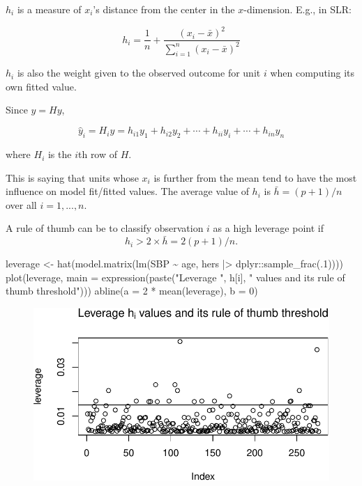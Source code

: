 \documentclass[
  letterpaper,
  DIV=11,
  numbers=noendperiod]{scrreport}
\newenvironment{Shaded}{\begin{snugshade}}{\end{snugshade}}
\newcommand{\AttributeTok}[1]{\textcolor[rgb]{0.40,0.45,0.13}{#1}}
\newcommand{\DecValTok}[1]{\textcolor[rgb]{0.68,0.00,0.00}{#1}}
\newcommand{\FunctionTok}[1]{\textcolor[rgb]{0.28,0.35,0.67}{#1}}
\newcommand{\NormalTok}[1]{\textcolor[rgb]{0.00,0.23,0.31}{#1}}
\newcommand{\OtherTok}[1]{\textcolor[rgb]{0.00,0.23,0.31}{#1}}
\newcommand{\SpecialCharTok}[1]{\textcolor[rgb]{0.37,0.37,0.37}{#1}}
\newcommand{\StringTok}[1]{\textcolor[rgb]{0.13,0.47,0.30}{#1}}
\begin{document}
\(h_i\) is a measure of \(x_i\)'s distance from the center in the
\(x\)-dimension. E.g., in SLR:

\[h_i = \frac{1}{n} + \frac{(x_i - \bar x)^2}{\sum_{i=1}^n (x_i - \bar x)^2}\]

\(h_i\) is also the weight given to the observed outcome for unit \(i\)
when computing its own fitted value.

Since \(\hat y = Hy\),

\[\hat y_i = H_i y = h_{i1}y_1 + h_{i2} y_2 + \cdots + h_{ii}y_i + \cdots + h_{in}y_n\]

where \(H_i\) is the \(i\)th row of \(H\).

This is saying that units whose \(x_i\) is further from the mean tend to
have the most influence on model fit/fitted values. The average value of
\(h_i\) is \(\bar h = (p+1)/n\) over all \(i = 1, ..., n\).

A rule of thumb can be to classify observation \(i\) as a high leverage
point if \[h_i > 2 \times \bar h = 2 (p+1)/n.\]

\begin{Shaded}
\begin{Highlighting}[]
\NormalTok{leverage }\OtherTok{\textless{}{-}} \FunctionTok{hat}\NormalTok{(}\FunctionTok{model.matrix}\NormalTok{(}\FunctionTok{lm}\NormalTok{(SBP }\SpecialCharTok{\textasciitilde{}}\NormalTok{ age, hers }\SpecialCharTok{|\textgreater{}}\NormalTok{ dplyr}\SpecialCharTok{::}\FunctionTok{sample\_frac}\NormalTok{(.}\DecValTok{1}\NormalTok{))))}
\FunctionTok{plot}\NormalTok{(leverage, }\AttributeTok{main =} \FunctionTok{expression}\NormalTok{(}\FunctionTok{paste}\NormalTok{(}\StringTok{"Leverage "}\NormalTok{, h[i], }\StringTok{" values and its rule of thumb threshold"}\NormalTok{)))}
\FunctionTok{abline}\NormalTok{(}\AttributeTok{a =} \DecValTok{2} \SpecialCharTok{*} \FunctionTok{mean}\NormalTok{(leverage), }\AttributeTok{b =} \DecValTok{0}\NormalTok{)}
\end{Highlighting}
\end{Shaded}

\begin{figure}[H]

{\centering \includegraphics{week4/week4_files/figure-pdf/unnamed-chunk-11-1.pdf}

}

\end{figure}
\end{document}
